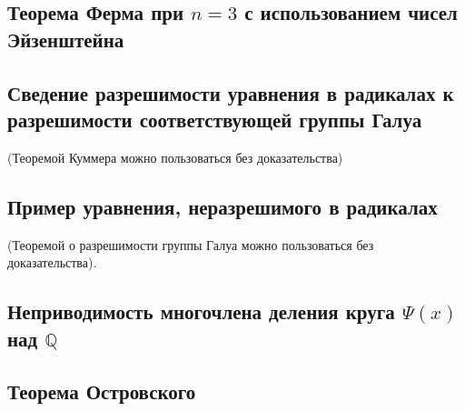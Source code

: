 \documentclass[../main.tex]{subfiles}
\begin{document}
\hypertarget{9.6}{\subsection{Теорема Ферма при $n = 3$ с использованием чисел Эйзенштейна}}

\hypertarget{9.7}{\subsection{Сведение разрешимости уравнения в радикалах к разрешимости соответствующей группы Галуа}}
(Теоремой Куммера можно пользоваться без доказательства)
\hypertarget{9.8}{\subsection{Пример уравнения, неразрешимого в радикалах}}
(Теоремой о разрешимости группы Галуа можно пользоваться без доказательства).

\hypertarget{9.9}{\subsection{Неприводимость многочлена деления круга $\Psi(x)$ над $\mathbb{Q}$}}

\hypertarget{9.10}{\subsection{Теорема Островского}}
\end{document}
